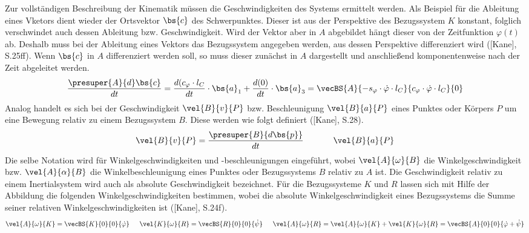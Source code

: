 Zur vollständigen Beschreibung der Kinematik müssen die Geschwindigkeiten des Systems ermittelt werden. Als Beispiel für die Ableitung eines Vketors dient wieder der Ortsvektor $\bs{c}$ des Schwerpunktes. Dieser ist aus der Perspektive des Bezugssystem $K$ konstant, folglich verschwindet auch dessen Ableitung bzw. Geschwindigkeit. Wird der Vektor aber in $A$ abgebildet hängt dieser von der Zeitfunktion $\varphi(t)$ ab. Deshalb muss bei der Ableitung eines Vektors das Bezugssystem angegeben werden, aus dessen Perspektive differenziert wird ([Kane], S.25ff). Wenn $\bs{c}$ in $A$ differenziert werden soll, so muss dieser zunächst in $A$ dargestellt und anschließend komponentenweise nach der Zeit abgeleitet werden.
\begin{equation}
\frac{\presuper{A}{d}\bs{c}}{dt} = \frac{d(c_{\varphi}\cdot l_C}{dt}\cdot \bs{a}_1 + \frac{d(0)}{dt}\cdot \bs{a}_3 = \vecBS{A}{-s_{\varphi}\cdot \dot{\varphi}\cdot l_C}{c_{\varphi}\cdot \dot{\varphi}\cdot l_C}{0}
\end{equation}
Analog handelt es sich bei der Geschwindigkeit $\vel{B}{v}{P}$ bzw. Beschleunigung $\vel{B}{a}{P}$ eines Punktes oder Körpers $P$ um eine Bewegung relativ zu einem Bezugssystem $B$. Diese werden wie folgt definiert ([Kane], S.28).
\begin{equation}
\vel{B}{v}{P} = \frac{\presuper{B}{d\bs{p}}}{dt} \hspace{35pt} \vel{B}{a}{P}
\end{equation}
Die selbe Notation wird für Winkelgeschwindigkeiten und -beschleunigungen eingeführt, wobei $\vel{A}{\omega}{B}$ die Winkelgeschwindigkeit bzw. $\vel{A}{\alpha}{B}$ die Winkelbeschleunigung eines Punktes oder Bezugssystems $B$ relativ zu $A$ ist. Die Geschwindigkeit relativ zu einem Inertialsystem wird auch als absolute Geschwindigkeit bezeichnet. Für die Bezugssysteme $K$ und $R$ lassen sich mit Hilfe der Abbildung \cite{skizze_dynamik_edge} die folgenden Winkelgeschwindigkeiten bestimmen, wobei die absolute Winkelgeschwindigkeit eines Bezugssystems die Summe seiner relativen Winkelgeschwindigkeiten ist ([Kane], S.24f).
\begin{equation}
\vel{A}{\omega}{K} = \vecBS{K}{0}{0}{\dot{\varphi}} \hspace{15pt} \vel{K}{\omega}{R} = \vecBS{R}{0}{0}{\dot{\psi}} \hspace{15pt} \vel{A}{\omega}{R} = \vel{A}{\omega}{K} + \vel{K}{\omega}{R} = \vecBS{A}{0}{0}{\dot{\varphi} + \dot{\psi}}
\end{equation}
